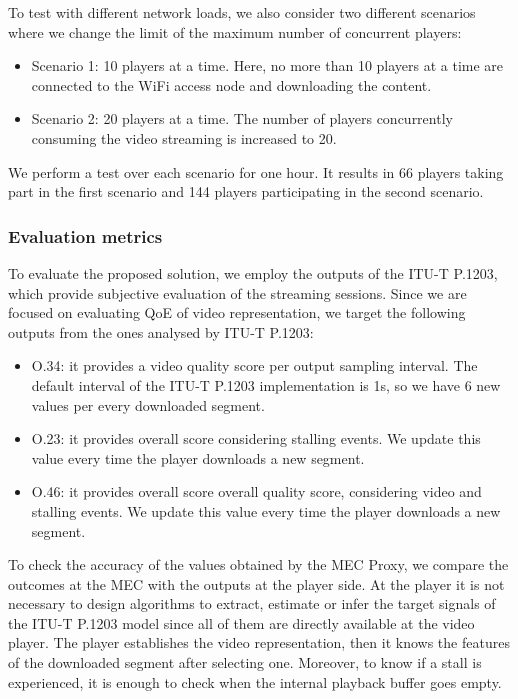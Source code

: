 To test with different network loads, we also consider two different scenarios where we change the limit of the maximum number of concurrent players:

\begin{itemize}
	\item Scenario 1: 10 players at a time. Here, no more than 10 players at a time are connected to the WiFi access node and downloading the content.
	\item Scenario 2: 20 players at a time. The number of players concurrently consuming the video streaming is increased to 20.
\end{itemize}

We perform a test over each scenario for one hour. It results in 66 players taking part in the first scenario and 144 players participating in the second scenario.


\subsubsection{Evaluation metrics}
\label{sec:MTAP202042}

To evaluate the proposed solution, we employ the outputs of the ITU-T P.1203, which provide subjective evaluation of the streaming sessions. Since we are focused on evaluating QoE of video representation, we target the following outputs from the ones analysed by ITU-T P.1203:

\begin{itemize}
	\item O.34: it provides a video quality score per output sampling interval. The default interval of the ITU-T P.1203 implementation is 1s, so we have 6 new values per every downloaded segment.
	\item O.23: it provides overall score considering stalling events. We update this value every time the player downloads a new segment.
	\item O.46: it provides overall score overall quality score, considering video and stalling events. We update this value every time the player downloads a new segment.
\end{itemize}

To check the accuracy of the values obtained by the MEC Proxy, we compare the outcomes at the MEC with the outputs at the player side. At the player it is not necessary to design algorithms to extract, estimate or infer the target signals of the ITU-T P.1203 model since all of them are directly available at the video player. The player establishes the video representation, then it knows the features of the downloaded segment after selecting one. Moreover, to know if a stall is experienced, it is enough to check when the internal playback buffer goes empty.

